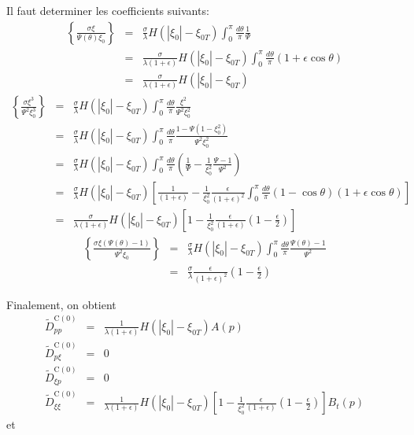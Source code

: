 Il faut determiner les coefficients suivants: \begin{eqnarray*}
\left\{ \frac{\sigma\xi}{\Psi(\theta)\xi_{0}}\right\}  & = & \frac{\sigma}{\lambda}H(|\xi_{0}|-\xi_{0T})\int_{0}^{\pi}\frac{d\theta}{\pi}\frac{1}{\Psi}\\
 & = & \frac{\sigma}{\lambda\left(1+\epsilon\right)}H(|\xi_{0}|-\xi_{0T})\int_{0}^{\pi}\frac{d\theta}{\pi}\left(1+\epsilon\cos\theta\right)\\
 & = & \frac{\sigma}{\lambda\left(1+\epsilon\right)}H(|\xi_{0}|-\xi_{0T})\end{eqnarray*}
\begin{eqnarray*}
\left\{ \frac{\sigma\xi^{3}}{\Psi^{2}\xi_{0}^{3}}\right\}  & = & \frac{\sigma}{\lambda}H(|\xi_{0}|-\xi_{0T})\int_{0}^{\pi}\frac{d\theta}{\pi}\frac{\xi^{2}}{\Psi^{2}\xi_{0}^{2}}\\
 & = & \frac{\sigma}{\lambda}H(|\xi_{0}|-\xi_{0T})\int_{0}^{\pi}\frac{d\theta}{\pi}\frac{1-\Psi(1-\xi_{0}^{2})}{\Psi^{2}\xi_{0}^{2}}\\
 & = & \frac{\sigma}{\lambda}H(|\xi_{0}|-\xi_{0T})\int_{0}^{\pi}\frac{d\theta}{\pi}\left(\frac{1}{\Psi}-\frac{1}{\xi_{0}^{2}}\frac{\Psi-1}{\Psi^{2}}\right)\\
 & = & \frac{\sigma}{\lambda}H(|\xi_{0}|-\xi_{0T})\left[\frac{1}{\left(1+\epsilon\right)}-\frac{1}{\xi_{0}^{2}}\frac{\epsilon}{\left(1+\epsilon\right)^{2}}\int_{0}^{\pi}\frac{d\theta}{\pi}\left(1-\cos\theta\right)\left(1+\epsilon\cos\theta\right)\right]\\
 & = & \frac{\sigma}{\lambda\left(1+\epsilon\right)}H(|\xi_{0}|-\xi_{0T})\left[1-\frac{1}{\xi_{0}^{2}}\frac{\epsilon}{\left(1+\epsilon\right)}\left(1-\frac{\epsilon}{2}\right)\right]\end{eqnarray*}
\begin{eqnarray*}
\left\{ \frac{\sigma\xi\left(\Psi(\theta)-1\right)}{\Psi^{2}\xi_{0}}\right\}  & = & \frac{\sigma}{\lambda}H(|\xi_{0}|-\xi_{0T})\int_{0}^{\pi}\frac{d\theta}{\pi}\frac{\Psi(\theta)-1}{\Psi^{2}}\\
 & = & \frac{\sigma}{\lambda}\frac{\epsilon}{\left(1+\epsilon\right)^{2}}\left(1-\frac{\epsilon}{2}\right)\end{eqnarray*}


Finalement, on obtient \begin{eqnarray*}
\widetilde{D}_{pp}^{\text{C}(0)} & = & \frac{1}{\lambda\left(1+\epsilon\right)}H(|\xi_{0}|-\xi_{0T})A(p)\\
\widetilde{D}_{p\xi}^{\text{C}(0)} & = & 0\\
\widetilde{D}_{\xi p}^{\text{C}(0)} & = & 0\\
\widetilde{D}_{\xi\xi}^{\text{C}(0)} & = & \frac{1}{\lambda\left(1+\epsilon\right)}H(|\xi_{0}|-\xi_{0T})\left[1-\frac{1}{\xi_{0}^{2}}\frac{\epsilon}{\left(1+\epsilon\right)}\left(1-\frac{\epsilon}{2}\right)\right]B_{t}(p)\end{eqnarray*}
 et

